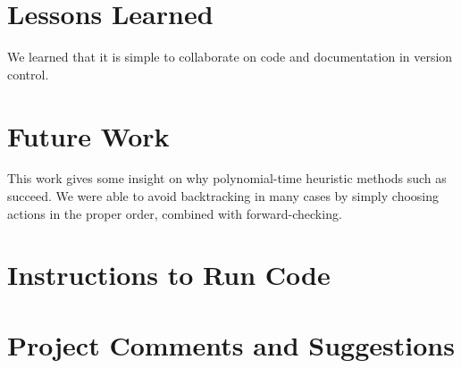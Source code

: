 \section{Lessons Learned}

We learned that it is simple to collaborate on code and documentation in version control.

\section{Future Work}

This work gives some insight on why polynomial-time heuristic methods such as \cite{ipdpsEbnenasir11} succeed.
We were able to avoid backtracking in many cases by simply choosing actions in the proper order, combined with forward-checking.

\section{Instructions to Run Code}

\section{Project Comments and Suggestions}










